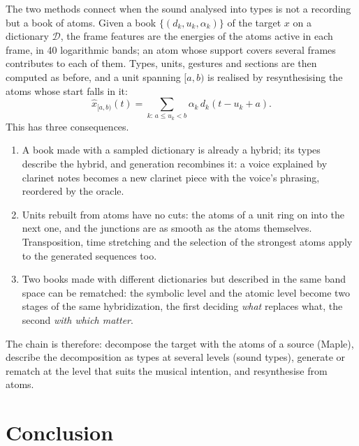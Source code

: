 \documentclass[11pt,a4paper]{article}
\newcommand{\D}{\mathcal{D}}
\begin{document}
The two methods connect when the sound analysed into types is not a
recording but a book of atoms. Given a book $\{(d_k, u_k, \alpha_k)\}$ of
the target $x$ on a dictionary $\D$, the frame features are the energies of
the atoms active in each frame, in 40 logarithmic bands; an atom whose
support covers several frames contributes to each of them. Types, units,
gestures and sections are then computed as before, and a unit spanning
$[a, b)$ is realised by resynthesising the atoms whose start falls in it:
\begin{equation}
  \hat x_{[a,b)}(t) = \sum_{k :\, a \le u_k < b} \alpha_k\, d_k(t - u_k + a).
\end{equation}
This has three consequences.
\begin{enumerate}[leftmargin=*]
  \item A book made with a sampled dictionary is already a hybrid; its types
    describe the hybrid, and generation recombines it: a voice explained by
    clarinet notes becomes a new clarinet piece with the voice's phrasing,
    reordered by the oracle.
  \item Units rebuilt from atoms have no cuts: the atoms of a unit ring on
    into the next one, and the junctions are as smooth as the atoms
    themselves. Transposition, time stretching and the selection of the
    strongest atoms apply to the generated sequences too.
  \item Two books made with different dictionaries but described in the same
    band space can be rematched: the symbolic level and the atomic level
    become two stages of the same hybridization, the first deciding
    \emph{what} replaces what, the second \emph{with which matter}.
\end{enumerate}
The chain is therefore: decompose the target with the atoms of a source
(Maple), describe the decomposition as types at several levels (sound
types), generate or rematch at the level that suits the musical intention,
and resynthesise from atoms.

\section{Conclusion}
\end{document}
